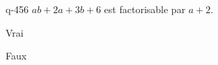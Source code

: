 \begin{truefalse}{q-456}
$ab+2a+3b+6$ est factorisable par $a+2$.
\item Vrai
\item* Faux
\end{truefalse}

